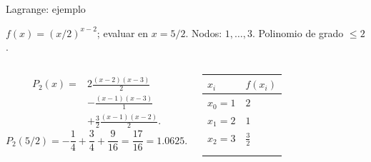 \documentclass[original_version/main.tex]{subfiles}
\begin{document}
\begin{frame}[t]{Lagrange: ejemplo}
\par\noindent\begin{minipage}[t][7.5mm][t]{\textwidth}\small\strut $f(x)=(x/2)^{x-2}$; evaluar en $x=5/2$. Nodos: $1,\ldots,3$. Polinomio de grado $\le 2$.\end{minipage}\par\nointerlineskip
\begin{columns}[T]\small\setlength{\abovedisplayskip}{4pt}\setlength{\belowdisplayskip}{4pt}\small\begin{align*}
P_2(x)={}&2\frac{(x-2)(x-3)}{2}\\
&-\frac{(x-1)(x-3)}{1}\\
&+\frac32\frac{(x-1)(x-2)}{2}.
\end{align*}\[P_2(5/2)=-\frac14+\frac34+\frac9{16}=\frac{17}{16}=1.0625.\]\begingroup\small\setlength{\tabcolsep}{3pt}\begin{center}\begin{tabular}{|C{.42\textwidth}|C{.42\textwidth}|}\hline
\rule[-2mm]{0pt}{6mm}$x_i$&$f(x_i)$\\\hline
\rule[-2.5mm]{0pt}{6mm}$x_0=1$&$2$\\\hline
\rule[-2.5mm]{0pt}{6mm}$x_1=2$&$1$\\\hline
\rule[-2.5mm]{0pt}{6mm}$x_2=3$&$\frac{3}{2}$\\\hline
\rule[-2.5mm]{0pt}{6mm}&\\\hline
\rule[-2.5mm]{0pt}{6mm}&\\\hline
\end{tabular}\end{center}\endgroup\par
\end{columns}
\end{frame}
\end{document}
